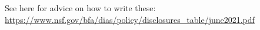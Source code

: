See here for advice on how to write these:
\url{https://www.nsf.gov/bfa/dias/policy/disclosures_table/june2021.pdf}